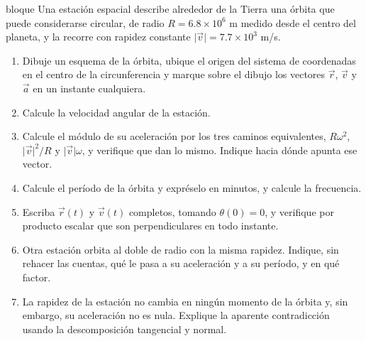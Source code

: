 \documentclass[11pt,openany]{book}
\begin{document}
\begin{ejercicio}{bloque}
Una estación espacial describe alrededor de la Tierra una órbita que puede considerarse circular, de radio $R = 6.8 \times 10^{6}$ m medido desde el centro del planeta, y la recorre con rapidez constante $\lvert\vec v\rvert = 7.7 \times 10^{3}$ m/s.
\begin{enumerate}[label=(\alph*), leftmargin=1.7em, itemsep=1pt, topsep=3pt]
  \item Dibuje un esquema de la órbita, ubique el origen del sistema de coordenadas en el centro de la circunferencia y marque sobre el dibujo los vectores $\vec r$, $\vec v$ y $\vec a$ en un instante cualquiera.
  \item Calcule la velocidad angular de la estación.
  \item Calcule el módulo de su aceleración por los tres caminos equivalentes, $R\omega^2$, $\lvert\vec v\rvert^2/R$ y $\lvert\vec v\rvert\omega$, y verifique que dan lo mismo. Indique hacia dónde apunta ese vector.
  \item Calcule el período de la órbita y expréselo en minutos, y calcule la frecuencia.
  \item Escriba $\vec r(t)$ y $\vec v(t)$ completos, tomando $\theta(0) = 0$, y verifique por producto escalar que son perpendiculares en todo instante.
  \item Otra estación orbita al doble de radio con la misma rapidez. Indique, sin rehacer las cuentas, qué le pasa a su aceleración y a su período, y en qué factor.
  \item La rapidez de la estación no cambia en ningún momento de la órbita y, sin embargo, su aceleración no es nula. Explique la aparente contradicción usando la descomposición tangencial y normal.
\end{enumerate}
\end{ejercicio}
\end{document}
